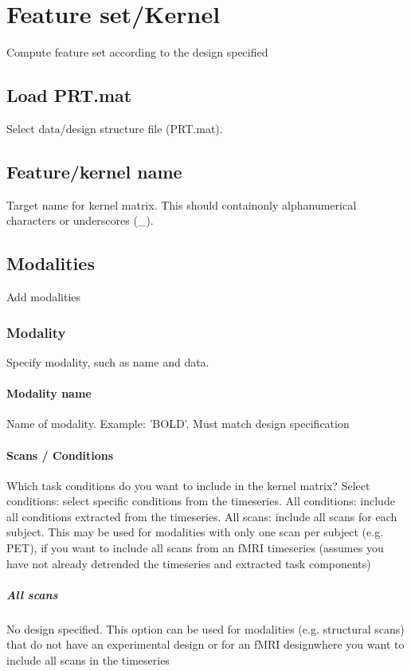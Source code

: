 
\chapter{Feature set/Kernel  \label{Chap:fs}}

\vskip 1.5cm

Compute feature set according to the design specified


\section{Load PRT.mat}
Select data/design structure file (PRT.mat).


\section{Feature/kernel name}
Target name for kernel matrix. This should containonly alphanumerical characters or underscores (\_).


\section{Modalities}
Add modalities


\subsection{Modality}
Specify modality, such as name and data.


\subsubsection{Modality name}
Name of modality. Example: 'BOLD'. Must match design specification


\subsubsection{Scans / Conditions}
Which task conditions do you want to include in the kernel matrix? Select conditions: select specific conditions from the timeseries. All conditions: include all conditions extracted from the timeseries. All scans: include all scans for each subject. This may be used for modalities with only one scan per subject (e.g. PET), if you want to include all scans from an fMRI timeseries (assumes you have not already detrended the timeseries and extracted task components)


\paragraph{All scans}
No design specified. This option can be used for modalities (e.g. structural scans) that do not have an experimental design or for an fMRI designwhere you want to include all scans in the timeseries


